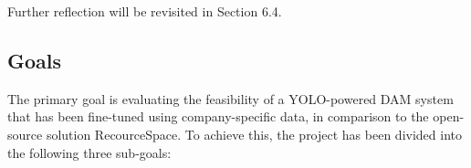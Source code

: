 \documentclass[a4paper,12pt,twocolumn]{article}
\numberwithin{figure}{section}
\numberwithin{table}{section}
\begin{document}
\vspace{0.3cm}
Further reflection will be revisited in Section 6.4.


\subsection{Goals}


The primary goal is evaluating the feasibility of a YOLO-powered DAM
system that has been fine-tuned using company-specific data, 
in comparison to the open-source solution RecourceSpace.
To achieve this, the project has been divided into the following three sub-goals:
\end{document}
